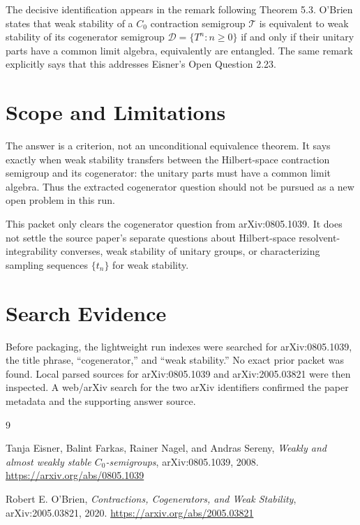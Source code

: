 \documentclass[11pt]{amsart}
\begin{document}
The decisive identification appears in the remark following Theorem 5.3.
O'Brien states that weak stability of a $C_0$ contraction semigroup
$\mathcal T$ is equivalent to weak stability of its cogenerator semigroup
$\mathcal D=\{T^n:n\geq 0\}$ if and only if their unitary parts have a common
limit algebra, equivalently are entangled. The same remark explicitly says that
this addresses Eisner's Open Question 2.23.

\section*{Scope and Limitations}

The answer is a criterion, not an unconditional equivalence theorem. It says
exactly when weak stability transfers between the Hilbert-space contraction
semigroup and its cogenerator: the unitary parts must have a common limit
algebra. Thus the extracted cogenerator question should not be pursued as a new
open problem in this run.

This packet only clears the cogenerator question from arXiv:0805.1039. It does
not settle the source paper's separate questions about Hilbert-space
resolvent-integrability converses, weak stability of unitary groups, or
characterizing sampling sequences $\{t_n\}$ for weak stability.

\section*{Search Evidence}

Before packaging, the lightweight run indexes were searched for arXiv:0805.1039,
the title phrase, ``cogenerator,'' and ``weak stability.'' No exact prior packet
was found. Local parsed sources for arXiv:0805.1039 and arXiv:2005.03821 were
then inspected. A web/arXiv search for the two arXiv identifiers confirmed the
paper metadata and the supporting answer source.

\begin{thebibliography}{9}

Tanja Eisner, Balint Farkas, Rainer Nagel, and Andras Sereny,
\emph{Weakly and almost weakly stable $C_0$-semigroups},
arXiv:0805.1039, 2008.
\url{https://arxiv.org/abs/0805.1039}

Robert E. O'Brien,
\emph{Contractions, Cogenerators, and Weak Stability},
arXiv:2005.03821, 2020.
\url{https://arxiv.org/abs/2005.03821}

\end{thebibliography}
\end{document}
